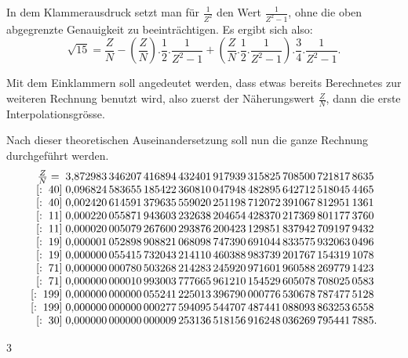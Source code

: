 \noindent In dem Klammerausdruck setzt man für $\frac{1}{Z^2}$ den Wert $\frac{1}{Z^2-1}$, ohne die oben
abgegrenzte Genauigkeit zu beeinträchtigen. Es ergibt sich also:
\[
\sqrt{15}=\frac{Z}{N}-\left(\frac{Z}{N}\right)\mathord{.}\frac{1}{2}\mathord{.}\frac{1}{Z^2-1}+\left(\frac{Z}{N}\mathord{.}\frac{1}{2}\mathord{.}\frac{1}{Z^2-1}\right)\mathord{.}\frac{3}{4}\mathord{.}\frac{1}{Z^2-1}.
\]
\par\noindent\hspace*{\parindent}Mit dem Einklammern soll angedeutet werden, dass etwas bereits Berechnetes zur weiteren Rechnung benutzt wird, also zuerst der Näherungswert $\frac{Z}{N}$, dann die erste Interpolationsgrösse.
\par\noindent\hspace*{\parindent}Nach dieser theoretischen Auseinandersetzung soll nun die ganze Rechnung durchgeführt werden.
\begingroup\small\setlength{\arraycolsep}{3pt}\renewcommand{\arraystretch}{1.2}
\[
\begin{array}{r@{\;}l}
\frac{Z}{N}={}&3{,}872983\,346207\,416894\,432401\,917939\,315825\,708500\,721817\,8635\\
{}[:\;40]&0{,}096824\,583655\,185422\,360810\,047948\,482895\,642712\,518045\,4465\\
{}[:\;40]&0{,}002420\,614591\,379635\,559020\,251198\,712072\,391067\,812951\,1361\\
{}[:\;11]&0{,}000220\,055871\,943603\,232638\,204654\,428370\,217369\,801177\,3760\\
{}[:\;11]&0{,}000020\,005079\,267600\,293876\,200423\,129851\,837942\,709197\,9432\\
{}[:\;19]&0{,}000001\,052898\,908821\,068098\,747390\,691044\,833575\,932063\,0496\\
{}[:\;19]&0{,}000000\,055415\,732043\,214110\,460388\,983739\,201767\,154319\,1078\\
{}[:\;71]&0{,}000000\,000780\,503268\,214283\,245920\,971601\,960588\,269779\,1423\\
{}[:\;71]&0{,}000000\,000010\,993003\,777665\,961210\,154529\,605078\,708025\,0583\\
{}[:\;199]&0{,}000000\,000000\,055241\,225013\,396790\,000776\,530678\,787477\,5128\\
{}[:\;199]&0{,}000000\,000000\,000277\,594095\,544707\,487441\,088093\,863253\,6558\\
{}[:\;30]&0{,}000000\,000000\,000009\,253136\,518156\,916248\,036269\,795441\,7885.
\end{array}
\]
\endgroup
\par\smallskip{}\hfill{\small 3}\par
